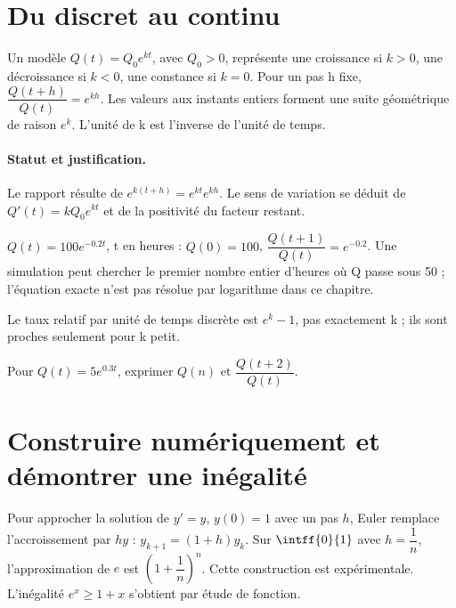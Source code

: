 \section{Du discret au continu}\label{C09-U4}
\begin{keypoint}
Un modèle $Q(t)=Q_0e^{kt}$, avec $Q_0>0$, représente une croissance si $k>0$, une décroissance si $k<0$, une constance si $k=0$. Pour un pas h fixe, $\dfrac{Q(t+h)}{Q(t)}=e^{kh}$. Les valeurs aux instants entiers forment une suite géométrique de raison $e^k$. L’unité de k est l’inverse de l’unité de temps.
\end{keypoint}
\paragraph{Statut et justification.} Le rapport résulte de $e^{k(t+h)}=e^{kt}e^{kh}$. Le sens de variation se déduit de $Q\prime(t)=kQ_0e^{kt}$ et de la positivité du facteur restant.
\begin{example}$Q(t)=100e^{-\num{0,2}t}$, t en heures : $Q(0)=100$, $\dfrac{Q(t+1)}{Q(t)}=e^{-\num{0,2}}$. Une simulation peut chercher le premier nombre entier d’heures où Q passe sous 50 ; l’équation exacte n’est pas résolue par logarithme dans ce chapitre.\end{example}\label{C09-EX4}
\begin{pitfall}Le taux relatif par unité de temps discrète est $e^k-1$, pas exactement k ; ils sont proches seulement pour k petit.\end{pitfall}
\begin{application}Pour $Q(t)=5e^{\num{0,3}t}$, exprimer $Q(n)$ et $\dfrac{Q(t+2)}{Q(t)}$.\end{application}\label{C09-AP4}
\section{Construire numériquement et démontrer une inégalité}\label{C09-U5}
\begin{keypoint}
Pour approcher la solution de $y\prime=y$, $y(0)=1$ avec un pas $h$, Euler remplace l’accroissement par $hy$ : $y_{k+1}=(1+h)y_k$. Sur $\intff{0}{1}$ avec $h=\dfrac1n$, l’approximation de $e$ est $\left(1+\dfrac1n\right)^n$. Cette construction est expérimentale. L’inégalité $e^x\geq1+x$ s’obtient par étude de fonction.
\end{keypoint}
